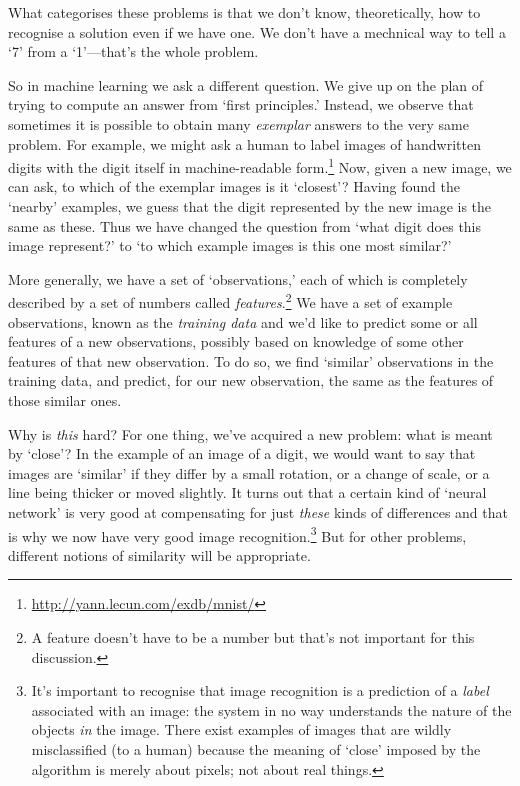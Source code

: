 \documentclass[10pt, a4, twocolumn]{article}
\begin{document}
What categorises these problems is that we don't know, theoretically, how to
recognise a solution even if we have one. We don't have a mechnical way to tell
a `7' from a `1'---that's the whole problem.

So in machine learning we ask a different question. We give up on the plan of
trying to compute an answer from `first principles.' Instead, we observe that
sometimes it is possible to obtain many \emph{exemplar} answers to the very same
problem. For example, we might ask a human to label images of handwritten digits
with the digit itself in machine-readable
form.\footnote{\url{http://yann.lecun.com/exdb/mnist/}} Now, given a new image,
we can ask, to which of the exemplar images is it `closest'? Having found the
`nearby' examples, we guess that the digit represented by the new image is the
same as these. Thus we have changed the question from `what digit does this
image represent?' to `to which example images is this one most similar?'

More generally, we have a set of `observations,' each of which is completely
described by a set of numbers called \emph{features}.\footnote{A feature doesn't
have to be a number but that's not important for this discussion.}  We have a
set of example observations, known as the \emph{training data} and we'd like to
predict some or all features of a new observations, possibly based on knowledge
of some other features of that new observation. To do so, we find `similar'
observations in the training data, and predict, for our new observation, the
same as the features of those similar ones.

Why is \emph{this} hard? For one thing, we've acquired a new problem: what is
meant by `close'? In the example of an image of a digit, we would want to say
that images are `similar' if they differ by a small rotation, or a change of
scale, or a line being thicker or moved slightly. It turns out that a certain
kind of `neural network' is very good at compensating for just \emph{these}
kinds of differences and that is why we now have very good image
recognition.\footnote{It's important to recognise that image recognition is a
prediction of a \emph{label} associated with an image: the system in no way
understands the nature of the objects \emph{in} the image. There exist examples
of images that are wildly misclassified (to a human) because the meaning of
`close' imposed by the algorithm is merely about pixels; not about real things.}
But for other problems, different notions of similarity will be appropriate.
\end{document}
